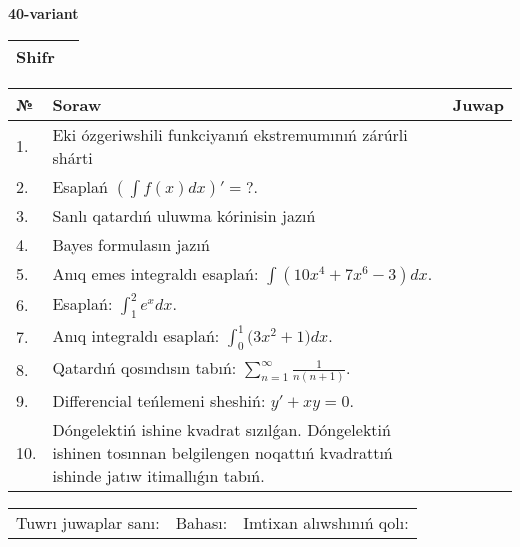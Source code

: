 \documentclass{article}
\begin{document}
  \egroup
  
  \newpage
  
  
  \textbf{40-variant}\\
  
  \bgroup
  \def\arraystretch{1.6} %
  
  \begin{tabular}{|m{5.7cm}|m{9.5cm}|}
  \hline
  Shifr & \\
  \hline
  \end{tabular}
  
  \vspace{1cm}
  
  \begin{tabular}{|m{0.7cm}|m{10cm}|m{4cm}|}
  \hline
  № & Soraw & Juwap \\
  \hline
  1. & Eki ózgeriwshili funkciyanıń ekstremumınıń zárúrli shárti &  \\
  \hline
  2. & Esaplań \(\left( \int{f(x)dx} \right)' = ?\). &  \\
  \hline
  3. & Sanlı qatardıń uluwma kórinisin jazıń &  \\
  \hline
  4. & Bayes formulasın jazıń &  \\
  \hline
  5. & Anıq emes integraldı esaplań: \(\int{\left( 10x^{4} + 7x^{6} - 3 \right)dx}\). &  \\
  \hline
  6. & Esaplań: \(\int_{1}^2 {e^{x}dx}\). &  \\
  \hline
  7. & Anıq integraldı esaplań: \(\int_{0}^{1}{(3x^2 } + 1)dx\). &  \\
  \hline
  8. & Qatardıń qosındısın tabıń: \(\sum_{n = 1}^{\infty}\frac{1}{n(n + 1)}\). &  \\
  \hline
  9. & Differencial teńlemeni sheshiń: \(y' + xy = 0\). &  \\
  \hline
  10. & Dóngelektiń ishine kvadrat sızılǵan. Dóngelektiń ishinen tosınnan belgilengen noqattıń kvadrattıń ishinde jatıw itimallıǵın tabıń. &  \\
  \hline
  \end{tabular}
  
  \vspace{1cm}
  
  \begin{tabular}{lll}
  Tuwrı juwaplar sanı: \underline{\hspace{1.5cm}} & 
  Bahası: \underline{\hspace{1.5cm}} & 
  Imtixan alıwshınıń qolı: \underline{\hspace{2cm}} \\
  \end{tabular}
  
\end{document}
